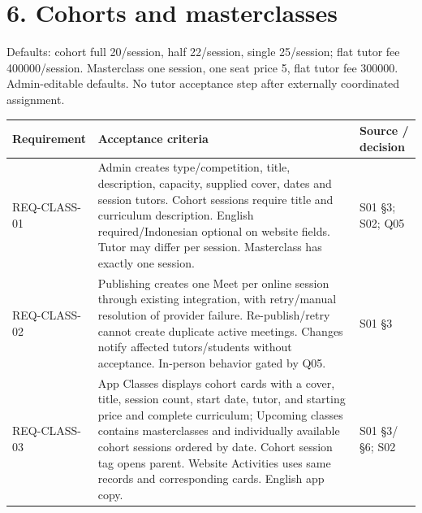 \documentclass[11pt,a4paper]{article}
\newcounter{none}
\begin{document}
\section{6. Cohorts and masterclasses}\label{cohorts-and-masterclasses}

Defaults: cohort full 20/session, half 22/session, single 25/session; flat tutor fee 400000/session. Masterclass one session, one seat price 5, flat tutor fee 300000. Admin-editable defaults. No tutor acceptance step after externally coordinated assignment.

{\def\LTcaptype{none} %
\begin{longtable}[]{@{}
  >{\raggedright\arraybackslash}p{}
  >{\raggedright\arraybackslash}p{}
  >{\raggedright\arraybackslash}p{}@{}}
\toprule\noalign{}
\begin{minipage}[b]{\linewidth}\raggedright
Requirement
\end{minipage} & \begin{minipage}[b]{\linewidth}\raggedright
Acceptance criteria
\end{minipage} & \begin{minipage}[b]{\linewidth}\raggedright
Source / decision
\end{minipage} \\
\midrule\noalign{}
\endhead
\bottomrule\noalign{}
\endlastfoot
REQ-CLASS-01 & Admin creates type/competition, title, description, capacity, supplied cover, dates and session tutors. Cohort sessions require title and curriculum description. English required/Indonesian optional on website fields. Tutor may differ per session. Masterclass has exactly one session. & S01 §3; S02; Q05 \\
REQ-CLASS-02 & Publishing creates one Meet per online session through existing integration, with retry/manual resolution of provider failure. Re-publish/retry cannot create duplicate active meetings. Changes notify affected tutors/students without acceptance. In-person behavior gated by Q05. & S01 §3 \\
REQ-CLASS-03 & App Classes displays cohort cards with a cover, title, session count, start date, tutor, and starting price and complete curriculum; Upcoming classes contains masterclasses and individually available cohort sessions ordered by date. Cohort session tag opens parent. Website Activities uses same records and corresponding cards. English app copy. & S01 §3/§6; S02 \\

\end{longtable}}
\end{document}
